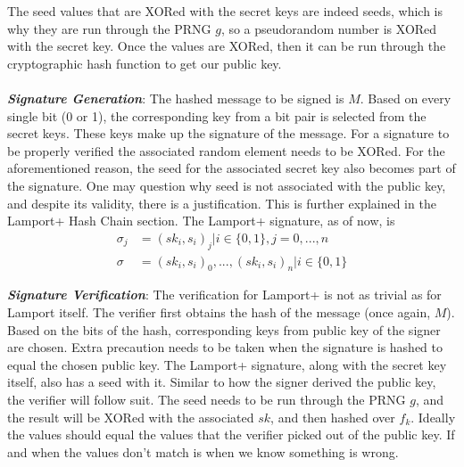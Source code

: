 \documentclass[]{scrartcl}
\makeatletter
\newcommand{\mathcenter}{\@fleqnfalse}
\makeatother
\begin{document}
The seed values that are XORed with the secret keys are indeed seeds, which is why they are run through the PRNG $g$, so a pseudorandom number is XORed with the secret key. Once the values are XORed, then it can be run through the cryptographic hash function to get our public key.\\ \\
\textbf{\textit{Signature Generation}}: The hashed message to be signed is $M$. Based on every single bit (0 or 1), the corresponding key from a bit pair is selected from the secret keys. These keys make up the signature of the message. For a signature to be properly verified the associated random element needs to be XORed. For the aforementioned reason, the seed for the associated secret key also becomes part of the signature. One may question why seed is not associated with the public key, and despite its validity, there is a justification. This is further explained in the Lamport+ Hash Chain section. The Lamport+ signature, as of now, is  
\mathcenter
\begin{equation}
\begin{split}
\sigma_j & = (sk_i, s_i)_j | i \in \{0, 1\}, j = 0,...,n \\
\sigma & = (sk_i, s_i)_0,...,(sk_i, s_i)_n | i \in \{0, 1\}
\end{split}
\end{equation}

\textbf{\textit{Signature Verification}}: The verification for Lamport+ is not as trivial as for Lamport itself. The verifier first obtains the hash of the message (once again, $M$). Based on the bits of the hash, corresponding keys from public key of the signer are chosen. Extra precaution needs to be taken when the signature is hashed to equal the chosen public key. The Lamport+ signature, along with the secret key itself, also has a seed with it. Similar to how the signer derived the public key, the verifier will follow suit. The seed needs to be run through the PRNG $g$, and the result will be XORed with the associated $sk$, and then hashed over $f_k$. Ideally the values should equal the values that the verifier picked out of the public key. If and when the values don't match is when we know something is wrong.
\end{document}
